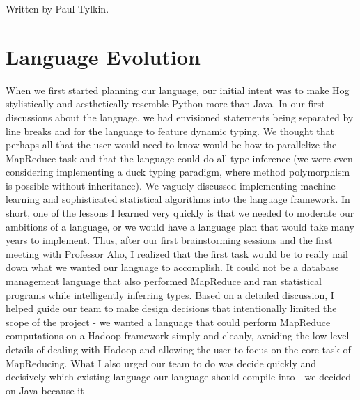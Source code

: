 \documentclass{report}
\begin{document}
Written by Paul Tylkin.

\section{Language Evolution}
When we first started planning our language, our initial intent was to make Hog stylistically and aesthetically resemble Python more than Java. In our first discussions about the language, we had envisioned statements being separated by line breaks and for the language to feature dynamic typing. We thought that perhaps all that the user would need to know would be how to parallelize the MapReduce task and that the language could do all type inference (we were even considering implementing a duck typing paradigm, where method polymorphism is possible without inheritance). We vaguely discussed implementing machine learning and sophisticated statistical algorithms into the language framework. In short, one of the lessons I learned very quickly is that we needed to moderate our ambitions of a language, or we would have a language plan that would take many years to implement. Thus, after our first brainstorming sessions and the first meeting with Professor Aho, I realized that the first task would be to really nail down what we wanted our language to accomplish. It could not be a database management language that also performed MapReduce and ran statistical programs while intelligently inferring types. Based on a detailed discussion, I helped guide our team to make design decisions that intentionally limited the scope of the project - we wanted a language that could perform MapReduce computations on a Hadoop framework simply and cleanly, avoiding the low-level details of dealing with Hadoop and allowing the user to focus on the core task of MapReducing. What I also urged our team to do was decide quickly and decisively which existing language our language should compile into - we decided on Java because it 
\end{document}
